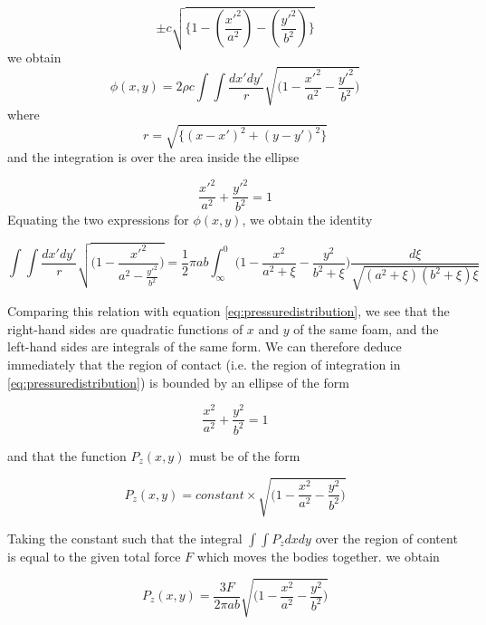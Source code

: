 \begin{equation}
\pm c \sqrt{\{1-(\frac{x'^{2}}{a^{2}})-(\frac{y'^{2}}{b^{2}})\}}
\end{equation}
we obtain
\begin{equation}
\phi (x,y) = 2\rho c \int\int\frac{dx'dy'}{r}\sqrt{\Big(1-\frac{x'^{2}}{a^{2}} - \frac{y'^{2}}{b^{2}} \Big)}
\end{equation}
where
\begin{equation}
r = \sqrt{\{(x-x')^{2}+(y-y')^{2}\}}
\end{equation}
and the integration is over the area inside the ellipse

\begin{equation}
\frac{x'^{2}}{a^{2}} + \frac{y'^{2}}{b^{2}} = 1
\end{equation}
Equating the two expressions for $\phi(x,y)$, we obtain the identity

\begin{equation}
\int\int\frac{dx'dy'}{r}\sqrt{\Big( 1- \frac{x'^{2}}{a^{2} - \frac{y'^{2}}{b^{2}}} \Big)} = \frac{1}{2}\pi ab\int_{\infty}^{0} \Big( 1-\frac{x^{2}}{a^{2}+\xi} - \frac{y^{2}}{b^{2}+\xi} \Big) \frac{d\xi}{\sqrt{(a^{2}+\xi)(b^{2}+\xi)\xi}}
\label{eq:integrated_phi}
\end{equation}

Comparing this relation with equation \ref{eq:pressuredistribution}, we see that the right-hand sides are quadratic functions of $x$ and $y$ of the same foam, and the left-hand sides are integrals of the same form. We can therefore deduce immediately that the region of contact (i.e. the region of integration in \ref{eq:pressuredistribution}) is bounded
by an ellipse of the form

\begin{equation}
\frac{x^{2}}{a^{2}} + \frac{y^{2}}{b^{2}} = 1
\label{eq:ellipse}
\end{equation}




and that the function $P_{z}(x,y)$ must be of the form

\begin{equation}
P_{z}(x,y) = constant \times \sqrt{\Big( 1 - \frac{x^{2}}{a^{2}} - \frac{y^{2}}{b^{2}} \Big)}
\end{equation}


Taking the constant such that the integral $\int\int P_{z}dxdy$ over the region of
content is equal to the given total force $F$ which moves the bodies together.
we obtain

\begin{equation}
P_{z}(x,y) = \frac{3F}{2\pi ab} \sqrt{\Big( 1 - \frac{x^{2}}{a^{2}} - \frac{y^{2}}{b^{2}} \Big)}
\label{eq:contactforce}
\end{equation}

